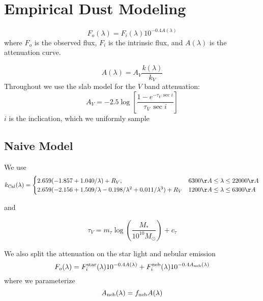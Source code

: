 \section{Empirical Dust Modeling} \label{sec:methods}

\begin{equation} 
    F_o (\lambda) = F_i (\lambda) 10^{-0.4 A(\lambda)}
\end{equation}
where $F_o$ is the observed flux, $F_i$ is the intrinsic flux, and $A(\lambda)$
is the attenuation curve. 


\begin{equation} 
    A(\lambda) = A_V \frac{k(\lambda)}{k_V} 
\end{equation}
Throughout we use the slab model \citep{somerville1999} for the $V$ band
attenuation:  
\begin{equation} 
    A_V = -2.5 \log \left[ \frac{1 - e^{-\tau_V\,\sec i}}{\tau_V\,\sec i} \right]
\end{equation}
$i$ is the inclication, which we uniformly sample 

\subsection{Naive Model} 
We use \cite{calzetti2001} 
\[
    k_{\rm Cal}(\lambda) = 
    \begin{cases} 
        2.659 (-1.857 + 1.040/\lambda) + R_V, & 6300 \AA \le \lambda \le
        22000 \AA \\ 
        2.659 (-2.156 + 1.509/\lambda - 0.198/\lambda^2 + 0.011/\lambda^3) +
        R_V & 1200 \AA \le \lambda \le 6300 \AA
    \end{cases}
\]

and 

\begin{equation}
    \tau_V = m_\tau \log \left(\frac{M_*}{10^{10} M_\odot}\right) + c_\tau
\end{equation} 

We also split the attenuation on the star light and nebular emission 
\begin{equation} 
    F_o (\lambda) = F^{\rm star}_i (\lambda) 10^{-0.4 A(\lambda)} + F^{\rm
    neb}_i (\lambda) 10^{-0.4 A_{\rm neb}(\lambda)}
\end{equation}
where we parameterize
\begin{equation}
    A_{\rm neb}(\lambda) = f_{\rm neb}  A(\lambda) 
\end{equation} 

